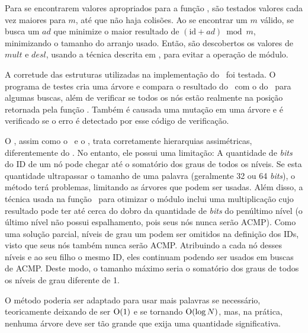 Para se encontrarem valores apropriados para a função \Espalha, são testados valores cada vez maiores para $m$, até que não haja colisões.
Ao se encontrar um $m$ válido, se busca um $\mathit{ad}$ que minimize o maior resultado de $(\mathrm{id} + \mathit{ad}) \bmod m$, minimizando o tamanho do arranjo usado.
Então, são descobertos os valores de $\mathit{mult}$ e $\mathit{desl}$, usando a técnica descrita em , para evitar a operação de módulo.

A corretude das estruturas utilizadas na implementação do \Novo\ foi testada.
O programa de testes cria uma árvore e compara o resultado do \Simples\ com o do \Novo\ para algumas buscas, além de verificar se todos os nós estão realmente na posição retornada pela função \Espalha.
Também é causada uma mutação em uma árvore e é verificado se o erro é detectado por esse código de verificação.


O \Novo, assim como o \Hwloc\ e o \Matriz, trata corretamente hierarquias assimétricas, diferentemente do \Simples.
No entanto, ele possui uma limitação: %
A quantidade de \textit{bits} do ID de um nó pode chegar até o somatório dos graus de todos os níveis.
Se esta quantidade ultrapassar o tamanho de uma palavra (geralmente 32 ou 64 \textit{bits}), o método terá problemas, limitando as árvores que podem ser usadas.
Além disso, a técnica usada na função \Espalha\ para otimizar o módulo inclui uma multiplicação cujo resultado pode ter até cerca do dobro da quantidade de \textit{bits} do penúltimo nível (o último nível não possui espalhamento, pois seus nós nunca serão ACMP).
Como uma solução parcial, níveis de grau um podem ser omitidos na definição dos IDs, visto que seus nós também nunca serão ACMP.
Atribuindo a cada nó desses níveis e ao seu filho o mesmo ID, eles continuam podendo ser usados em buscas de ACMP.
Deste modo, o tamanho máximo seria o somatório dos graus de todos os níveis de grau diferente de 1.

O método poderia ser adaptado para usar mais palavras se necessário, teoricamente deixando de ser $\operatorname{O}(1)$ e se tornando $\operatorname{O}(\log N)$, mas, na prática, nenhuma árvore deve ser tão grande que exija uma quantidade significativa.

